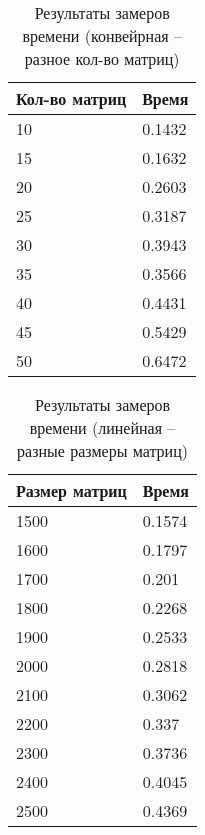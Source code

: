 \begin{table}[h]
    \begin{center}
        \begin{threeparttable}
        \captionsetup{justification=raggedright,singlelinecheck=off}
        \caption{Результаты замеров времени (конвейрная -- разное кол-во матриц)}
        \label{tbl:time_conv_count}
        \begin{tabular}{|p{6cm}|p{6cm}|}
            \hline
            Кол-во матриц & Время \\
            \hline
            10 & 0.1432 \\ \hline 
            15 & 0.1632 \\ \hline 
            20 & 0.2603 \\ \hline 
            25 & 0.3187 \\ \hline 
            30 & 0.3943 \\ \hline 
            35 & 0.3566 \\ \hline 
            40 & 0.4431 \\ \hline 
            45 & 0.5429 \\ \hline 
            50 & 0.6472 \\ \hline 

		\end{tabular}
    \end{threeparttable}
\end{center}
\end{table}


\begin{table}[h]
    \begin{center}
        \begin{threeparttable}
        \captionsetup{justification=raggedright,singlelinecheck=off}
        \caption{Результаты замеров времени (линейная -- разные размеры матриц)}
        \label{tbl:time_lin_size}
        \begin{tabular}{|p{6cm}|p{6cm}|}
            \hline
            Размер матриц & Время \\
            \hline
            1500 & 0.1574 \\ \hline 
            1600 & 0.1797 \\ \hline 
            1700 & 0.201 \\ \hline 
            1800 & 0.2268 \\ \hline 
            1900 & 0.2533 \\ \hline 
            2000 & 0.2818 \\ \hline 
            2100 & 0.3062 \\ \hline 
            2200 & 0.337 \\ \hline 
            2300 & 0.3736 \\ \hline 
            2400 & 0.4045 \\ \hline 
            2500 & 0.4369 \\ \hline 

		\end{tabular}
    \end{threeparttable}
\end{center}
\end{table}


